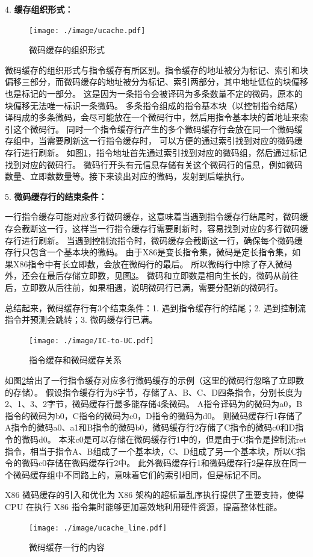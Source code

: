 4. \textbf{缓存组织形式：}

\begin{figure}[!htbp]
  \centering
  \texttt{[image: ./image/ucache.pdf]}
  \caption{微码缓存的组织形式}
  \label{img:ucache}
\end{figure}

微码缓存的组织形式与指令缓存有所区别。指令缓存的地址被分为标记、索引和块偏移三部分，而微码缓存的地址被分为标记、索引两部分，其中地址低位的块偏移也是标记的一部分。
这是因为一条指令会被译码为多条数量不定的微码，原本的块偏移无法唯一标识一条微码。
多条指令组成的指令基本块（以控制指令结尾）译码成的多条微码，会尽可能放在一个微码行中，然后用指令基本块的首地址来索引这个微码行。
同时一个指令缓存行产生的多个微码缓存行会放在同一个微码缓存组中，当需要刷新这一行指令缓存时， 可以方便的通过索引找到对应的微码缓存行进行刷新。
如图\ref{img:ucache}，指令地址首先通过索引找到对应的微码组，然后通过标记找到对应的微码行。
微码行开头有元信息存储有关这个微码行的信息，例如微码数量、立即数数量等。接下来读出对应的微码，发射到后端执行。


5. \textbf{微码缓存行的结束条件：}

一行指令缓存可能对应多行微码缓存，这意味着当遇到指令缓存行结尾时，微码缓存会截断这一行，这样当一行指令缓存行需要刷新时，容易找到对应的多行微码缓存行进行刷新。
当遇到控制流指令时，微码缓存会截断这一行，确保每个微码缓存行只包含一个基本块的微码。
由于X86是变长指令集，微码是定长指令集，如果X86指令中有长立即数，会放在微码行的最后。
所以微码行中除了存入微码外，还会在最后存储立即数，见图\ref{img:ucache_line}。
微码和立即数是相向生长的，微码从前往后，立即数从后往前，如果相遇，说明微码行已满，需要分配新的微码行。

总结起来，微码缓存行有3个结束条件：1. 遇到指令缓存行的结尾；2. 遇到控制流指令并预测会跳转；3. 微码缓存行已满。

\begin{figure}[!htbp]
  \centering
  \texttt{[image: ./image/IC-to-UC.pdf]}
  \caption{指令缓存和微码缓存关系}
  \label{img:IC_to_UC}
\end{figure}

如图\ref{img:IC_to_UC}给出了一行指令缓存对应多行微码缓存的示例（这里的微码行忽略了立即数的存储）。
假设指令缓存行为8字节，存储了A、B、C、D四条指令，分别长度为2、1、3、2字节，微码缓存行最多能存储4条微码。
A指令译码为的微码为a0，B指令的微码为b0，C指令的微码为c0，D指令的微码为d0。
则微码缓存行1存储了A指令的微码a0、a1和B指令的微码b0，微码缓存行2存储了C指令的微码c0和D指令的微码d0。
本来c0是可以存储在微码缓存行1中的，但是由于C指令是控制流ret指令，相当于指令A、B组成了一个基本块，C、D组成了另一个基本块，所以C指令的微码c0存储在微码缓存行2中。
此外微码缓存行1和微码缓存行2是存放在同一个微码缓存组中不同路上的，意味着它们的索引相同，但是标记不同。


X86 微码缓存的引入和优化为 X86 架构的超标量乱序执行提供了重要支持，使得 CPU 在执行 X86 指令集时能够更加高效地利用硬件资源，提高整体性能。

\begin{figure}[!htbp]
  \centering
  \texttt{[image: ./image/ucache\_line.pdf]}
  \caption{微码缓存一行的内容}
  \label{img:ucache_line}
\end{figure}
